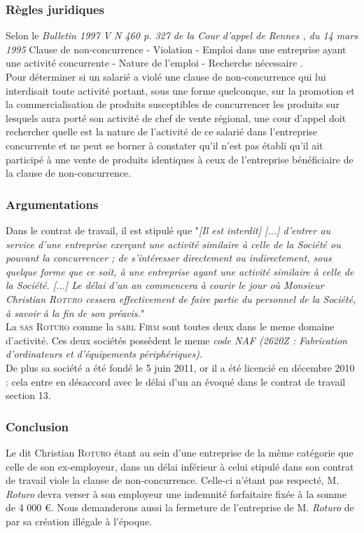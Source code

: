\subsubsection{Règles juridiques}
Selon le \textit{Bulletin 1997 V N 460 p. 327 de la  Cour d'appel de Rennes , du 14 mars 1995}
Clause de non-concurrence - Violation - Emploi dans une entreprise ayant une activité concurrente - Nature de l'emploi - Recherche nécessaire .\\
Pour déterminer si un salarié a violé une clause de non-concurrence qui lui interdisait toute activité portant, sous une forme quelconque, sur la promotion et la commercialisation de produits susceptibles de concurrencer les produits sur lesquels aura porté son activité de chef de vente régional, une cour d'appel doit rechercher quelle est la nature de l'activité de ce salarié dans l'entreprise concurrente et ne peut se borner à constater qu'il n'est pas établi qu'il ait participé à une vente de produits identiques à ceux de l'entreprise bénéficiaire de la clause de non-concurrence. 
\subsubsection{Argumentations}
Dans le contrat de travail, il est stipulé que "\emph{[Il est interdit] [...] d'entrer au service d'une entreprise exerçant une activité similaire à celle de la Société ou pouvant la concurrencer ; de s'intéresser directement ou indirectement, sous quelque forme que ce soit, à une entreprise ayant une activité similaire à celle de la Société. [...] Le délai d'un an commencera à courir le jour où Monsieur Christian \textsc{Roturo} cessera effectivement de faire partie du personnel de la Société, à savoir à la fin de son préavis.}"\\
La \textsc{sas Roturo} comme la \textsc{sarl Firm} sont toutes deux dans le meme domaine d'activité. Ces deux sociétés possèdent le meme \emph{code NAF (2620Z : Fabrication d'ordinateurs et d'équipements périphériques)}.\\
De plus sa société a été fondé le 5 juin 2011, or il a été licencié en décembre 2010 : cela entre en désaccord avec le délai d'un an évoqué dans le contrat de travail section 13.
\subsubsection{Conclusion}
Le dit Christian \textsc{Roturo} étant au sein d'une entreprise de la même catégorie que celle de son ex-employeur, dans un délai inférieur à celui stipulé dans son contrat de travail viole la clause de non-concurrence. Celle-ci n'étant pas respecté, M. \textit{Roturo} devra verser à son employeur une indemnité forfaitaire fixée à la somme de 4 000 \euro. Nous demanderons aussi la fermeture de l'entreprise de M. \textit{Roturo} de par sa création illégale à l'époque.


